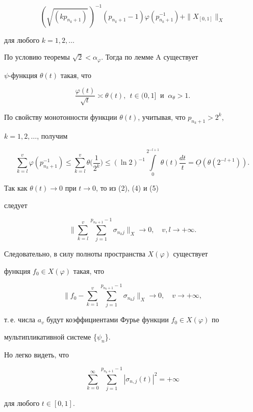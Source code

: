\begin{pf}
\begin{equation}
\left(\sqrt{(kp_{n_{k}+1})}\,\right)^{-1}(p_{n_{k}+1}-1)


\varphi(p_{n_{k}+1}^{-1}) +\|X_{[0,1]}\|_{X}


\end{equation}


для любого $k=1,2,\dotsc$


По условию теоремы $\sqrt{2}<\alpha_{\varphi}$. Тогда по лемме A существует


$\psi$-функ\-ция $\theta{(t)}$ такая, что


$$


\frac{\varphi(t)}{\sqrt{t}}\asymp \theta(t), \ \ t\in(0,1] 


\ \text{ и }\ \alpha_{\theta}>1.


$$


По свойству монотонности функции $\theta(t)$, учитывая, что $p_{n_k+1}>2^k$,


$k=1,2,\dotsc$, получим


\begin{equation}


\sum_{k=l}^{v}\varphi(p_{n_{k}+1}^{-1})\leq 


\sum_{k=l}^{v}\theta\bigg(\frac{1}{2^k}\bigg)\leq


(\ln2)^{-1}\int\limits_{0}^{2^{-l+1}} 


\theta(t)\frac{dt}{t}=\underline{O}(\theta(2^{-l+1})).


\end{equation}


Так как $\theta(t)\rightarrow 0$ при $t\rightarrow 0$, то из (2), (4) и (5) 


следует


$$


\bigg\|\sum_{k=l}^{v}\sum_{j=1}^{p_{n_k+1}-1}\sigma_{n_{k}j}


\bigg\|_{X}\rightarrow 0,\quad v, l\rightarrow +\infty.


$$


Следовательно, в силу полноты пространства $X(\varphi)$ существует 


функция $f_0\in X(\varphi)$ такая, что


$$


\bigg\|f_0-\sum_{k=1}^{v}\sum_{j=1}^{p_{n_k+1}-1}\sigma_{n_{k}j}\bigg\|_{X}


\rightarrow 0,\quad v\rightarrow +\infty,


$$


т.\,е. числа $a_v$ будут коэффициентами Фурье функции $f_0\in X(\varphi)$ по 


мультипликативной системе \{$\psi_n$\}.


Но легко видеть, что


$$


\sum_{k=0}^{\infty}\sum_{j=1}^{p_{n_k+1}-1}|\sigma_{n,j}(t)|^{2}=+\infty


$$


для любого $t\in[0,1]$.


\end{pf}






